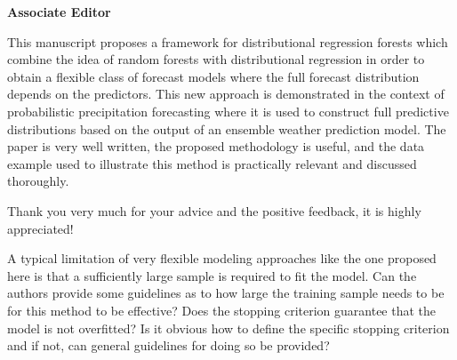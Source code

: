 \documentclass[american,foldmarks=false,noconfig]{uibklttr}
\newenvironment{review}{\fontshape{\itdefault}\fontseries{\bfdefault} \selectfont \smallskip}{\par}
\begin{document}
\newpage


\textbf{\LARGE Associate Editor}

\begin{review}
This manuscript proposes a framework for distributional regression 
forests which combine the idea of random forests with distributional 
regression in order to obtain a flexible class of forecast models 
where the full forecast distribution depends on the predictors. 
This new approach is demonstrated in the context of probabilistic 
precipitation forecasting where it is used to construct full 
predictive distributions based on the output of an ensemble 
weather prediction model. The paper is very well written, the 
proposed methodology is useful, and the data example used to 
illustrate this method is practically relevant and discussed 
thoroughly.
\end{review}

Thank you very much for your advice and the positive feedback, 
it is highly appreciated!


\begin{review}
A typical limitation of very flexible modeling approaches like 
the one proposed here is that a sufficiently large sample is 
required to fit the model. Can the authors provide some 
guidelines as to how large the training sample needs to be for 
this method to be effective? Does the stopping criterion 
guarantee that the model is not overfitted? 
Is it obvious how to define the specific stopping criterion and 
if not, can general guidelines for doing so be provided?
\end{review}
\end{document}
